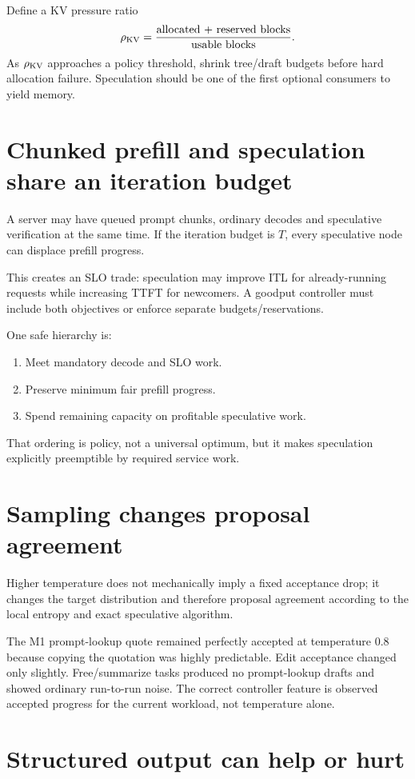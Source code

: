 Define a KV pressure ratio
\[
\rho_{\rm KV}=\frac{\text{allocated + reserved blocks}}{\text{usable blocks}}.
\]
As $\rho_{\rm KV}$ approaches a policy threshold, shrink tree/draft budgets before
hard allocation failure. Speculation should be one of the first optional consumers to
yield memory.

\section{Chunked prefill and speculation share an iteration budget}

A server may have queued prompt chunks, ordinary decodes and speculative verification
at the same time. If the iteration budget is $T$, every speculative node can displace
prefill progress.

This creates an SLO trade: speculation may improve ITL for already-running requests
while increasing TTFT for newcomers. A goodput controller must include both objectives
or enforce separate budgets/reservations.

One safe hierarchy is:
\begin{enumerate}
\item Meet mandatory decode and SLO work.
\item Preserve minimum fair prefill progress.
\item Spend remaining capacity on profitable speculative work.
\end{enumerate}
That ordering is policy, not a universal optimum, but it makes speculation explicitly
preemptible by required service work.

\section{Sampling changes proposal agreement}

Higher temperature does not mechanically imply a fixed acceptance drop; it changes the
target distribution and therefore proposal agreement according to the local entropy
and exact speculative algorithm.

The M1 prompt-lookup quote remained perfectly accepted at temperature 0.8 because
copying the quotation was highly predictable. Edit acceptance changed only slightly.
Free/summarize tasks produced no prompt-lookup drafts and showed ordinary run-to-run
noise. The correct controller feature is observed accepted progress for the current
workload, not temperature alone.

\section{Structured output can help or hurt}

